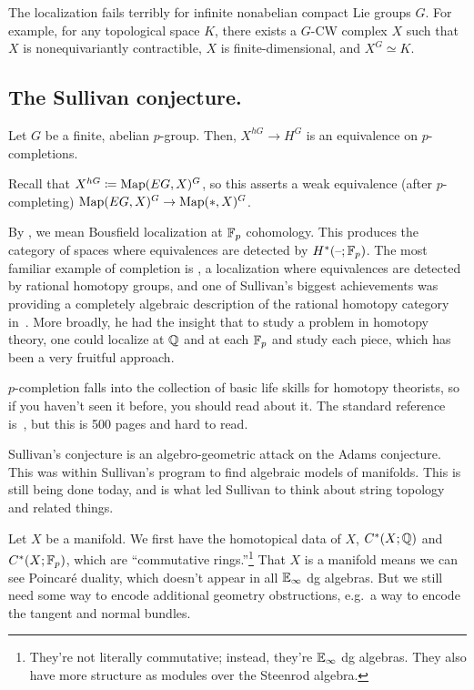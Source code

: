 The localization fails terribly for infinite nonabelian compact Lie groups $G$. For example, for any topological
space $K$, there exists a $G$-CW complex $X$ such that $X$ is nonequivariantly contractible, $X$ is
finite-dimensional, and $X^G\simeq K$.
\subsection*{The Sullivan conjecture.}
\begin{thm}
Let $G$ be a finite, abelian $p$-group. Then, $X^{hG}\to H^G$ is an equivalence on $p$-completions.
\end{thm}
Recall that $X^{hG} \coloneqq\operatorname{Map}(EG, X)^G$, so this asserts a weak equivalence (after $p$-completing) $\operatorname{Map}(EG,
X)^G\to\operatorname{Map}(*, X)^G$.

By , we mean Bousfield localization at $\mathbb F_p$ cohomology. This produces the category of
spaces where equivalences are detected by $H^*(\text{--};\mathbb F_p)$. The most familiar example of completion is
, a localization where equivalences are detected by rational homotopy groups, and one of
Sullivan's biggest achievements was providing a completely algebraic description of the rational homotopy
category in~\cite{SullivanQHT}.
More broadly, he had the insight that to study a problem in homotopy theory, one could localize at $\mathbb Q$ and at each
$\mathbb F_p$ and study each piece, which has been a very fruitful approach.

$p$-completion falls into the collection of basic life skills for homotopy theorists, so if you haven't seen it
before, you should read about it. The standard reference is~\cite{BousfieldKan}, but this is 500 pages and hard to
read.

Sullivan's conjecture is an algebro-geometric attack on the Adams conjecture. This was within Sullivan's program to
find algebraic models of manifolds. This is still being done today, and is what led Sullivan to think about string
topology and related things.

Let $X$ be a manifold. We first have the homotopical data of $X$, $C^*(X;\mathbb Q)$ and $C^*(X;\mathbb F_p)$, which are
``commutative rings.''\footnote{They're not literally commutative; instead, they're $\mathbb E_\infty$ dg algebras. They
also have more structure as modules over the Steenrod algebra.} That $X$ is a manifold means we can see Poincaré
duality, which doesn't appear in all $\mathbb E_\infty$ dg algebras. But we still need some way to encode additional
geometry obstructions, e.g.\ a way to encode the tangent and normal bundles.

